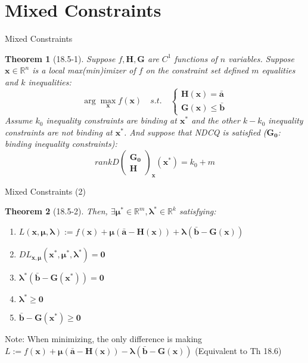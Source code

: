 \documentclass[a4paper,11pt]{article}
\newtheorem{thm}{Theorem}
\newcommand{\bb}{\mathbb}
\newcommand{\bd}{\mathbf}
\begin{document}
\section{Mixed Constraints} %
\label{sec:mixed_constraints}
\begin{frame}[t]{Mixed Constraints}
	\begin{thm}
		[18.5-1] Suppose $f,\bd{H},\bd{G}$ are $C^1$ functions of $n$ variables. Suppose $\bd{x}\in\bb{R}^n$ is a local max(min)imizer of $f$ on the constraint set defined $m$ equalities and $k$ inequalities:\[
			\arg\max_{\bd{x}}f(\bd{x}) \quad s.t.\quad \begin{cases}
				\bd{H(\bd{x})}=\bar{\bd{a}}\\
				\bd{G(\bd{x})}\le\bar{\bd{b}}
			\end{cases}
		\]
		Assume $k_0$ inequality constraints are binding at $\bd{x^\ast}$ and the other $k-k_0$ inequality constraints are not binding at $\bd{x^\ast}$. And suppose that NDCQ is satisfied ($\bd{G_0}$: binding inequality constraints):\[
			rank  D\begin{pmatrix}
				\bd{G_0}\\
				\bd{H}
			\end{pmatrix}_{\bd{x}}(\bd{x^\ast}) = k_0 + m
		\]
	\end{thm}
\end{frame}
\begin{frame}[t]{Mixed Constraints (2)}
	\begin{thm}
		[18.5-2] Then, $\exists \bd{\mu^\ast}\in\bb{R}^m,\bd{\lambda^\ast}\in\bb{R}^k$ satisfying:
		\begin{enumerate}
			\item $L(\bd{x},\bd{\mu},\bd{\lambda}):=f(\bd{x})+\bd{\mu}(\bar{\bd{a}}-\bd{H}(\bd{x}))+\bd{\lambda}(\bar{\bd{b}}-\bd{G(\bd{x})})$
			\item $DL_{\bd{x},\bd{\mu}}(\bd{x^\ast},\bd{\mu^\ast},\bd{\lambda^\ast})=\bd{0}$
			\item $\bd{\lambda^\ast}(\bar{\bd{b}}-\bd{G}(\bd{x^\ast}))=\bd{0}$
			\item $\bd{\lambda^\ast}\ge \bd{0}$
			\item $\bar{\bd{b}}-\bd{G(\bd{x^\ast})}\ge \bd{0}$
		\end{enumerate}
	\end{thm}
	Note: When minimizing, the only difference is making $L:=f(\bd{x})+\bd{\mu}(\bar{\bd{a}}-\bd{H}(\bd{x}))-\bd{\lambda}(\bar{\bd{b}}-\bd{G(\bd{x})})$ (Equivalent to Th 18.6)
\end{frame}
\end{document}
